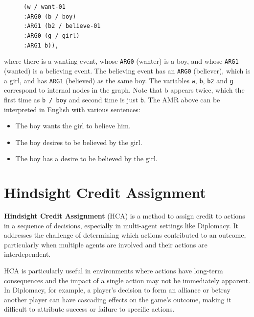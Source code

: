 \documentclass[oneside]{memoir}
\begin{document}
\begin{figure}[h]
    \small{ \texttt{(w / want-01\\
    \hspace*{4 mm}:ARG0 (b / boy)\\
    \hspace*{4 mm}:ARG1 (b2 / believe-01\\  
    \hspace*{8 mm}:ARG0 (g / girl)\\
    \hspace*{8 mm}:ARG1 b)),}}
\end{figure}
where there is a wanting event, whose \texttt{ARG0} (wanter) is a boy, and whose \texttt{ARG1} (wanted) is a believing event. The believing event has an \texttt{ARG0} (believer), which is a girl, and has \texttt{ARG1} (believed) as the same boy. The variables \texttt{w}, \texttt{b}, \texttt{b2} and \texttt{g} correspond to internal nodes in the graph. Note that b appears twice, which the first time as \texttt{b / boy} and second time is just \texttt{b}. The AMR above can be interpreted in English with various sentences:
\begin{itemize}
    \item The boy wants the girl to believe him.
    \item The boy desires to be believed by the girl.
    \item The boy has a desire to be believed by the girl.
\end{itemize}

\section{Hindsight Credit Assignment}
\textbf{Hindsight Credit Assignment} (HCA) is a method to assign credit to actions in a sequence of decisions, especially in multi-agent settings like Diplomacy. It addresses the challenge of determining which actions contributed to an outcome, particularly when multiple agents are involved and their actions are interdependent.

HCA is particularly useful in environments where actions have long-term consequences and the impact of a single action may not be immediately apparent. In Diplomacy, for example, a player's decision to form an alliance or betray another player can have cascading effects on the game's outcome, making it difficult to attribute success or failure to specific actions.
\end{document}
